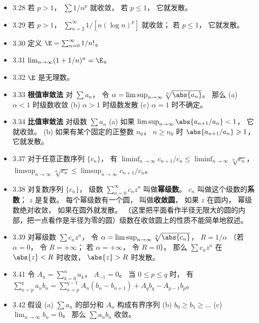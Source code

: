 \begin{itemize}
\item 3.28 若 $p>1$， $\sum 1/n^p$ 就收敛， 若 $p\leqslant 1$， 它就发散。

\item 3.29 若 $p>1$， $\sum_{n=2}^\infty 1/[n(\log n)^p]$ 就收敛； 若 $p\leqslant 1$， 它就发散。

\item 3.30 定义 $\E=\sum_{n=0}^\infty 1/n!$。

\item 3.31 $\lim_{n\to\infty} (1+1/n)^n = \E$。

\item 3.32 $\E$ 是无理数。

\item 3.33 \textbf{根值审敛法} 对 $\sum a_n$， 令 $\alpha = \limsup_{n\to\infty} \sqrt[n]{\abs{a_n}}$。 那么 (a) $\alpha<1$ 时级数收敛 (b) $\alpha>1$ 时级数发散 (c) $\alpha=1$ 时不确定。

\item 3.34 \textbf{比值审敛法} 对级数 $\sum a_n$ (a) 如果 $\limsup_{n\to\infty} \abs{a_{n+1}/a_n}<1$， 它就收敛。 (b) 如果有某个固定的正整数 $n_0$， $n\geqslant n_0$ 时 $\abs{a_{n+1}/a_n}\geqslant 1$， 它就发散。

\item 3.37 对于任意正数序列 $\{c_n\}$， 有 $\liminf_{n\to\infty} c_{n+1}/c_n \leqslant \liminf_{n\to\infty} \sqrt[n]{c_n}$， $\limsup_{n\to\infty} \sqrt[n]{c_n}\leqslant \limsup_{n\to\infty} c_{n+1}/c_n$。

\item 3.38 对复数序列 $\{c_n\}$， 级数 $\sum_{n=0}^\infty c_n z^n$ 叫做\textbf{幂级数}。 $c_n$ 叫做这个级数的\textbf{系数}； $z$ 是复数。 每个幂级数有一个圆， 叫做\textbf{收敛圆}， 如果 $z$ 在圆内， 幂级数绝对收敛， 如果在圆外就发散。 （这里把平面看作半径无限大的圆的内部，把一点看作是半径为零的圆）级数在收敛圆上的性质不能简单地叙述。

\item 3.39 对幂级数 $\sum c_n z^n$， 令 $\alpha=\limsup_{n\to\infty} \sqrt[n]{\abs{c_n}}$， $R=1/\alpha$ （若 $\alpha=0$， 令 $R=+\infty$； 若 $\alpha=+\infty$， 令 $R=0$）。 那么 $\sum c_n z^n$ 在 $\abs{z}<R$ 时收敛， $\abs{z}>R$ 时发散。

\item 3.41 令 $A_n=\sum_{k=0}^n a_k$， $A_{-1}=0$。 当 $0\leqslant p\leqslant q$ 时， 有 $\sum_{n=p}^q a_n b_n = \sum_{n=p}^{q-1} A_n(b_n-b_{n+1}) + A_qb_q - A_{p-1} b_p$。

\item 3.42 假设 (a) $\sum a_n$ 的部分和 $A_n$ 构成有界序列 (b) $b_0\geqslant b_1\geqslant \dots$ (c) $\lim_{n\to\infty} b_n=0$。 那么 $\sum a_n b_n$ 收敛。


\end{itemize}
